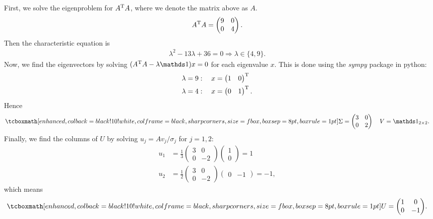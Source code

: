 First, we solve the eigenproblem for $A^{\rm T}A$, where we denote the matrix above as $A$.
\begin{eqnarray}
    \label{eq:AT-A_6}
    A^{\rm T}A = \begin{pmatrix}9 & 0\\0 & 4\end{pmatrix} 
.\end{eqnarray}
Then the characteristic equation is
\begin{eqnarray}
    \label{eq:char-eq_6}
    \lambda^{2} - 13 \lambda + 36 = 0 \Rightarrow \lambda \in \{4,9\}
.\end{eqnarray}
Now, we find the eigenvectors by solving $(A^{\rm T}A - \lambda\id)x = 0$ for each eigenvalue $x$.
This is done using the \textit{sympy} package in python:
\begin{align}
    \label{eq:corresponding-eigvec_6}
    &\lambda = 9: \quad x = \begin{pmatrix} 1 & 0 \end{pmatrix}^{\rm T} \\
    &\lambda = 4: \quad x = \begin{pmatrix} 0 & 1 \end{pmatrix}^{\rm T}
.\end{align}
Hence
\begin{eqnarray}
    \label{eq:Sig-V_6}
    \eqbox{
    \Sigma = \begin{pmatrix}
        3 & 0 \\
        0 & 2 
    \end{pmatrix}
    \quad
    V = \id_{2 \times 2} 
}
.\end{eqnarray}
Finally, we find the columns of $U$ by solving $u_{j} = Av_{j}/\sigma_{j}$ for $j = 1,2$:
\begin{align}
    \label{eq:U-vecs_6}
    u_{1} &= \frac{1}{3}\begin{pmatrix}
        3 & 0 \\
        0 & -2 
    \end{pmatrix}
    \begin{pmatrix}
    1 \\ 0
    \end{pmatrix}
    = 1  \\
    u_{2} &= \frac{1}{2}\begin{pmatrix}
        3 & 0 \\
        0 & -2
    \end{pmatrix}
    \begin{pmatrix}
    0 & -1   
    \end{pmatrix}
    = -1
,\end{align}
which means
\begin{eqnarray}
    \label{eq:U_6}
    \eqbox{
    U = \begin{pmatrix}
        1 & 0 \\
        0 & -1
    \end{pmatrix}
}
.\end{eqnarray}

